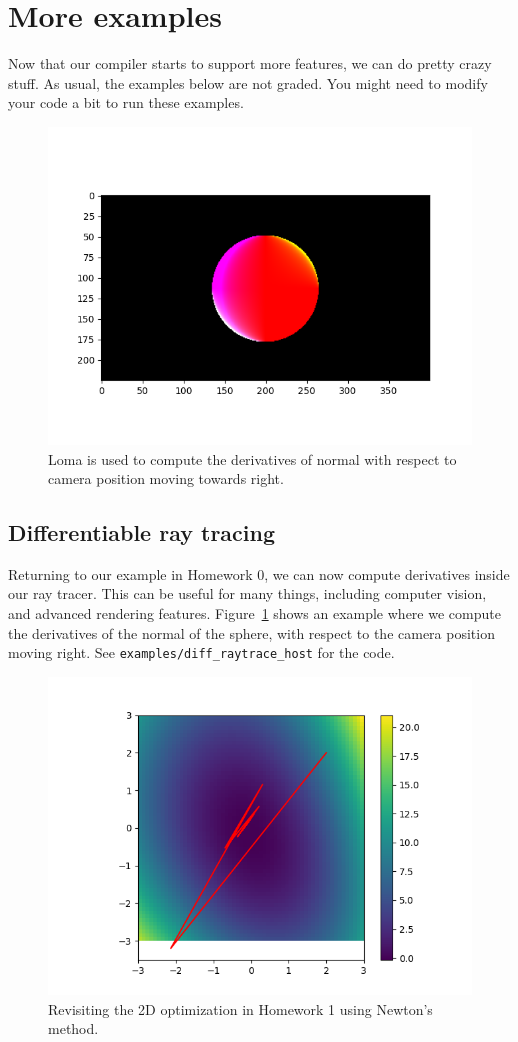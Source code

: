 \section{More examples}
Now that our compiler starts to support more features, we can do pretty crazy stuff. As usual, the examples below are not graded. You might need to modify your code a bit to run these examples.

\begin{figure}
\centering
\includegraphics[width=0.8\linewidth]{imgs/diff_raytrace.png}
\vspace{-20pt}
\caption{Loma is used to compute the derivatives of normal with respect to camera position moving towards right.}
\label{fig:diff_raytrace}
\end{figure}

\subsection{Differentiable ray tracing}
Returning to our example in Homework 0, we can now compute derivatives inside our ray tracer. This can be useful for many things, including computer vision, and advanced rendering features. Figure~\ref{fig:diff_raytrace} shows an example where we compute the derivatives of the normal of the sphere, with respect to the camera position moving right. See \lstinline{examples/diff_raytrace_host} for the code.

\begin{figure}
\centering
\includegraphics[width=0.8\linewidth]{imgs/optimize-newton.png}
\vspace{-20pt}
\caption{Revisiting the 2D optimization in Homework 1 using Newton's method.}
\label{fig:newton}
\end{figure}

